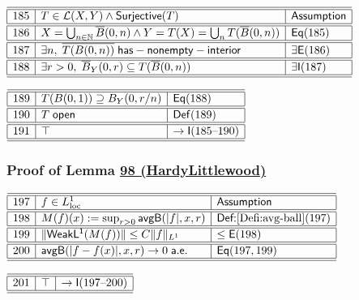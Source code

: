 \documentclass[11pt,reqno]{amsart}
\begin{document}
\noindent$%
\begin{array}{|r|l|l|}
\hline\hline
185 & T\in\mathcal{L}(X,Y)\wedge\mathsf{Surjective}(T) & \textsf{Assumption} \\ \hline\hline
186 & X=\bigcup_{n\in\mathbb{N}}\overline{B}(0,n)\wedge Y=T(X)=\bigcup_{n}T(\overline{B}(0,n)) & \mathsf{Eq}(185) \\ \hline\hline
187 & \exists n,\;\overline{T(B(0,n))}\;\mathsf{has-nonempty-interior} & \exists\mathsf{E}(186) \\ \hline\hline
188 & \exists r>0,\;\overline{B}_{Y}(0,r)\subseteq T(\overline{B}(0,n)) & \exists\mathsf{I}(187) \\ \hline\hline
\end{array}%
$

\medskip

\noindent$%
\begin{array}{|r|l|l|}
\hline\hline
189 & T(B(0,1))\supseteq B_{Y}(0,r/n) & \mathsf{Eq}(188) \\ \hline\hline
190 & T\;\mathsf{open} & \mathsf{Def}(189) \\ \hline\hline
191 & \top & \to\mathsf{I}(185\text{--}190) \\ \hline\hline
\end{array}%
$

\medskip

\subsubsection*{Proof of Lemma \hyperlink{lem:HardyLittlewood}{98 (\textsf{HardyLittlewood})}}

\noindent$%
\begin{array}{|r|l|l|}
\hline\hline
197 & f\in L^{1}_{\mathrm{loc}} & \textsf{Assumption} \\ \hline\hline
198 & M(f)(x):=\sup_{r>0}\mathsf{avgB}(|f|,x,r) & \textsf{Def:}\ref{Defi:avg-ball}(197) \\ \hline\hline
199 & \|\mathsf{WeakL^{1}}(M(f))\|\le C\|f\|_{L^{1}} & \le\mathsf{E}(198) \\ \hline\hline
200 & \mathsf{avgB}(|f-f(x)|,x,r)\to0\;\mathsf{a.e.} & \mathsf{Eq}(197,199) \\ \hline\hline
\end{array}%
$

\medskip

\noindent$%
\begin{array}{|r|l|l|}
\hline\hline
201 & \top & \to\mathsf{I}(197\text{--}200) \\ \hline\hline
\end{array}%
$
\end{document}
